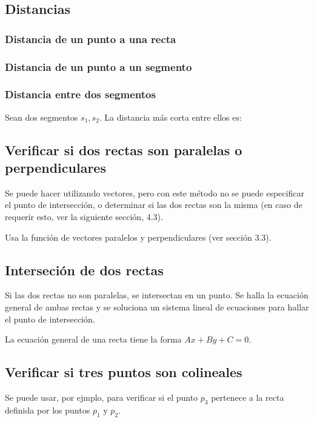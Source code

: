 \documentclass{article}
\begin{document}
\begin{multicols}{2}
\subsection{Distancias}

\subsubsection{Distancia de un punto a una recta}


\subsubsection{Distancia de un punto a un segmento}


\subsubsection{Distancia entre dos segmentos}
Sean dos segmentos \(s_1, s_2 \). La distancia más corta entre ellos es:
	 

\subsection{Verificar si dos rectas son paralelas o perpendiculares}
Se puede hacer utilizando vectores, pero con este método no se puede especificar el punto de intersección, o determinar si las dos rectas son la misma  (en caso de requerir esto, ver la siguiente sección, 4.3).

Usa la función de vectores paralelos y perpendiculares (ver sección 3.3).


\subsection{Interseción de dos rectas}
Si las dos rectas no son paralelas, se intersectan en un punto. Se halla la ecuación general de ambas rectas y se soluciona un sistema lineal de ecuaciones para hallar el punto de intersección.

La ecuación general de una recta tiene la forma \( Ax+By+C=0 \).


\subsection{Verificar si tres puntos son colineales}
Se puede usar, por ejmplo, para verificar si el punto \( p_3 \) pertenece a la recta definida por los puntos \( p_1 \) y \( p_2 \).




\end{multicols}
\end{document}
